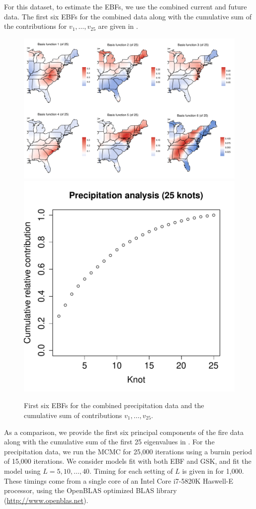 \documentclass[aoas]{imsart}
\begin{document}
For this dataset, to estimate the EBFs, we use the combined current and future data.
The first six EBFs for the combined data along with the cumulative sum of the contributions for $v_1, \ldots, v_{25}$ are given in .
\begin{figure}[htbp]  %
  \centering
  \includegraphics[width=\linewidth]{plots/precip-ebf-panel.pdf}\\
  \includegraphics[width=0.35\linewidth]{plots/precipv-25.pdf}
  \caption{First six EBFs for the combined precipitation data and the cumulative sum of contributions $v_1, \ldots, v_{25}$.}
  \label{ebfig:precip-ebfpanel}
\end{figure}
As a comparison, we provide the first six principal components of the fire data along with the cumulative sum of the first 25 eigenvalues in .
For the precipitation data, we run the MCMC for 25,000 iterations using a burnin period of 15,000 iterations.
We consider models fit with both EBF and GSK, and fit the model using $L = 5, 10, \ldots, 40$.
Timing for each setting of $L$ is given in  for 1,000.
These timings come from a single core of an Intel Core i7-5820K Haswell-E processor, using the OpenBLAS optimized BLAS library (\url{http://www.openblas.net}).
\end{document}
